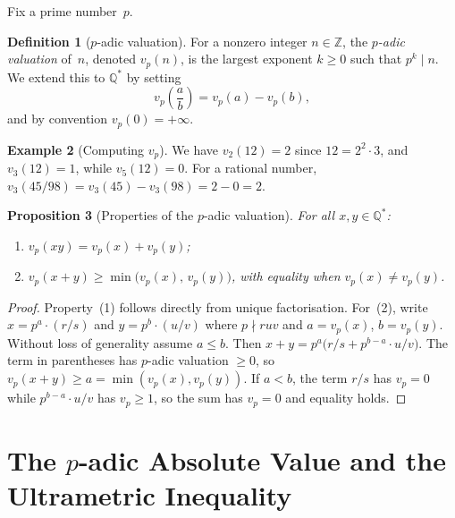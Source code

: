 \documentclass[12pt,a4paper,openany]{book}
\theoremstyle{definition}
\newtheorem{definition}{Definition}[chapter]
\newtheorem{example}[definition]{Example}
\theoremstyle{plain}
\newtheorem{proposition}[definition]{Proposition}
\theoremstyle{remark}
\newcommand{\Z}{\mathbb{Z}}
\newcommand{\Q}{\mathbb{Q}}
\begin{document}
Fix a prime number~$p$.

\begin{definition}[$p$-adic valuation]
\label{def:p-adic-valuation}
For a nonzero integer $n \in \Z$, the \emph{$p$-adic valuation} of~$n$,
denoted $v_p(n)$, is the largest exponent $k \geq 0$ such that $p^k \mid n$.
We extend this to $\Q^*$ by setting
\[
  v_p\!\left(\frac{a}{b}\right) = v_p(a) - v_p(b),
\]
and by convention $v_p(0) = +\infty$.
\end{definition}

\begin{example}[Computing $v_p$]
\label{ex:vp-computation}
We have $v_2(12) = 2$ since $12 = 2^2 \cdot 3$, and $v_3(12) = 1$, while
$v_5(12)=0$. For a rational number, $v_3(45/98) = v_3(45) - v_3(98) = 2 - 0 = 2$.
\end{example}

\begin{proposition}[Properties of the $p$-adic valuation]
\label{prop:vp-properties}
For all $x,y \in \Q^*$:
\begin{enumerate}
  \item $v_p(xy) = v_p(x) + v_p(y)$;
  \item $v_p(x+y) \geq \min\bigl(v_p(x),\, v_p(y)\bigr)$, with equality when
    $v_p(x) \neq v_p(y)$.
\end{enumerate}
\end{proposition}

\begin{proof}
Property~(1) follows directly from unique factorisation. For~(2), write
$x = p^a \cdot (r/s)$ and $y = p^b \cdot (u/v)$ where $p \nmid ruv$ and
$a = v_p(x)$, $b = v_p(y)$. Without loss of generality assume $a \leq b$.
Then $x + y = p^a\bigl(r/s + p^{b-a}\cdot u/v\bigr)$. The term in
parentheses has $p$-adic valuation $\geq 0$, so
$v_p(x+y) \geq a = \min(v_p(x), v_p(y))$. If $a < b$, the term $r/s$ has
$v_p = 0$ while $p^{b-a}\cdot u/v$ has $v_p \geq 1$, so the sum has $v_p = 0$
and equality holds.
\end{proof}

\section{The \texorpdfstring{$p$}{p}-adic Absolute Value and the Ultrametric Inequality}
\label{sec:p-adic-abs}
\end{document}
